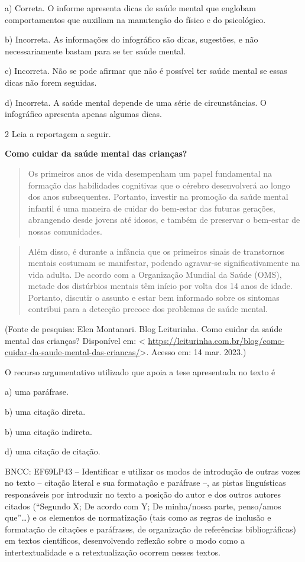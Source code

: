 {a) Correta. O informe apresenta dicas de saúde mental que englobam
comportamentos que auxiliam na manutenção do físico e do psicológico.

b) Incorreta. As informações do infográfico são dicas, sugestões, e não
necessariamente bastam para se ter saúde mental.

c) Incorreta. Não se pode afirmar que não é possível ter saúde mental se
essas dicas não forem seguidas.

d) Incorreta. A saúde mental depende de uma série de circunstâncias. O
infográfico apresenta apenas algumas dicas.

\num{2} Leia a reportagem a seguir.

\textbf{Como cuidar da saúde mental das crianças?}

\begin{quote}
Os primeiros anos de vida desempenham um papel fundamental na formação
das habilidades cognitivas que o cérebro desenvolverá ao longo dos anos
subsequentes. Portanto, investir na promoção da saúde mental infantil é
uma maneira de cuidar do bem-estar das futuras gerações, abrangendo
desde jovens até idosos, e também de preservar o bem-estar de nossas
comunidades.
\end{quote}

\begin{quote}
Além disso, é durante a infância que os primeiros sinais de transtornos
mentais costumam se manifestar, podendo agravar-se significativamente na
vida adulta. De acordo com a Organização Mundial da Saúde (OMS), metade
dos distúrbios mentais têm início por volta dos 14 anos de idade.
Portanto, discutir o assunto e estar bem informado sobre os sintomas
contribui para a detecção precoce dos problemas de saúde mental.
\end{quote}

(Fonte de pesquisa: Elen Montanari. Blog Leiturinha. Como cuidar da
saúde mental das crianças? Disponível em: \textless{}
\url{https://leiturinha.com.br/blog/como-cuidar-da-saude-mental-das-criancas/}\textgreater.
Acesso em: 14 mar. 2023.)

O recurso argumentativo utilizado que apoia a tese apresentada no texto
é

a) uma paráfrase.

b) uma citação direta.

b) uma citação indireta.

d) uma citação de citação.

BNCC: EF69LP43 -- Identificar e utilizar os modos de introdução de
outras vozes no texto -- citação literal e sua formatação e paráfrase
--, as pistas linguísticas responsáveis por introduzir no texto a
posição do autor e dos outros autores citados (``Segundo X; De acordo
com Y; De minha/nossa parte, penso/amos que''\ldots) e os elementos de
normatização (tais como as regras de inclusão e formatação de citações e
paráfrases, de organização de referências bibliográficas) em textos
científicos, desenvolvendo reflexão sobre o modo como a
intertextualidade e a retextualização ocorrem nesses textos.

}
